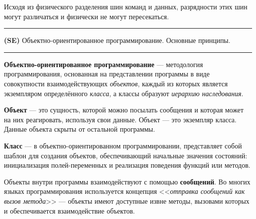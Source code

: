 \documentclass[12pt]{article}
\begin{document}
Исходя из физического разделения шин команд и данных, разрядности этих шин могут различаться и физически не могут пересекаться. \\


\noindent\rule{\textwidth}{1pt}
\textbf{(SE)} Объектно-ориентированное программирование. Основные принципы.

\noindent\rule{\textwidth}{1pt}

\textbf{Объектно-ориентированное программирование} ---  методология программирования, основанная на представлении программы в виде совокупности взаимодействующих \textit{объектов}, каждый из которых является экземпляром определённого \textit{класса}, а классы образуют \textit{иерархию наследования}.


\textbf{Объект} --- это сущность, которой можно посылать сообщения и которая может на них реагировать, используя свои данные. Объект --- это экземпляр класса. Данные объекта скрыты от остальной программы.

\textbf{Класс} --- в объектно-ориентированном программировании, представляет собой шаблон для создания объектов, обеспечивающий начальные значения состояний: инициализация полей-переменных и реализация поведения функций или методов.

Объекты внутри программы взаимодействуют с помощью \textbf{сообщений}. Во многих языках программирования используется концепция <<\textit{отправка сообщений как вызов метода}>> --- объекты имеют доступные извне методы, вызовами которых и обеспечивается взаимодействие объектов. \\
\end{document}

